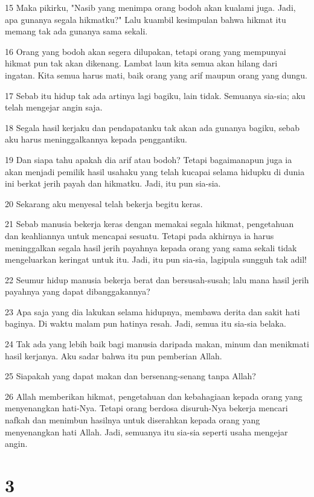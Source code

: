 \par 15 Maka pikirku, "Nasib yang menimpa orang bodoh akan kualami juga. Jadi, apa gunanya segala hikmatku?" Lalu kuambil kesimpulan bahwa hikmat itu memang tak ada gunanya sama sekali.
\par 16 Orang yang bodoh akan segera dilupakan, tetapi orang yang mempunyai hikmat pun tak akan dikenang. Lambat laun kita semua akan hilang dari ingatan. Kita semua harus mati, baik orang yang arif maupun orang yang dungu.
\par 17 Sebab itu hidup tak ada artinya lagi bagiku, lain tidak. Semuanya sia-sia; aku telah mengejar angin saja.
\par 18 Segala hasil kerjaku dan pendapatanku tak akan ada gunanya bagiku, sebab aku harus meninggalkannya kepada penggantiku.
\par 19 Dan siapa tahu apakah dia arif atau bodoh? Tetapi bagaimanapun juga ia akan menjadi pemilik hasil usahaku yang telah kucapai selama hidupku di dunia ini berkat jerih payah dan hikmatku. Jadi, itu pun sia-sia.
\par 20 Sekarang aku menyesal telah bekerja begitu keras.
\par 21 Sebab manusia bekerja keras dengan memakai segala hikmat, pengetahuan dan keahliannya untuk mencapai sesuatu. Tetapi pada akhirnya ia harus meninggalkan segala hasil jerih payahnya kepada orang yang sama sekali tidak mengeluarkan keringat untuk itu. Jadi, itu pun sia-sia, lagipula sungguh tak adil!
\par 22 Seumur hidup manusia bekerja berat dan bersusah-susah; lalu mana hasil jerih payahnya yang dapat dibanggakannya?
\par 23 Apa saja yang dia lakukan selama hidupnya, membawa derita dan sakit hati baginya. Di waktu malam pun hatinya resah. Jadi, semua itu sia-sia belaka.
\par 24 Tak ada yang lebih baik bagi manusia daripada makan, minum dan menikmati hasil kerjanya. Aku sadar bahwa itu pun pemberian Allah.
\par 25 Siapakah yang dapat makan dan bersenang-senang tanpa Allah?
\par 26 Allah memberikan hikmat, pengetahuan dan kebahagiaan kepada orang yang menyenangkan hati-Nya. Tetapi orang berdosa disuruh-Nya bekerja mencari nafkah dan menimbun hasilnya untuk diserahkan kepada orang yang menyenangkan hati Allah. Jadi, semuanya itu sia-sia seperti usaha mengejar angin.

\chapter{3}

